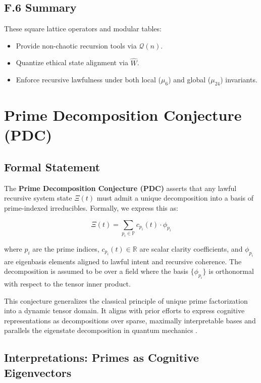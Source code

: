 \documentclass[12]{amsart}
\theoremstyle{plain}
\begin{document}
\subsection*{F.6 Summary}

These square lattice operators and modular tables:
\begin{itemize}
    \item Provide non-chaotic recursion tools via $\mathcal{Q}(n)$.
    \item Quantize ethical state alignment via $\hat{W}$.
    \item Enforce recursive lawfulness under both local ($\mu_6$) and global ($\mu_{24}$) invariants.
\end{itemize}

\section{Prime Decomposition Conjecture (PDC)}

\subsection{Formal Statement}

The \textbf{Prime Decomposition Conjecture (PDC)} asserts that any lawful recursive system state $\Xi(t)$ must admit a unique decomposition into a basis of prime-indexed irreducibles. Formally, we express this as:

\[
\Xi(t) = \sum_{p_i \in \mathbb{P}} c_{p_i}(t) \cdot \phi_{p_i}
\]

where $p_i$ are the prime indices, $c_{p_i}(t) \in \mathbb{R}$ are scalar clarity coefficients, and $\phi_{p_i}$ are eigenbasis elements aligned to lawful intent and recursive coherence. The decomposition is assumed to be over a field where the basis $\{ \phi_{p_i} \}$ is orthonormal with respect to the tensor inner product.

This conjecture generalizes the classical principle of unique prime factorization into a dynamic tensor domain. It aligns with prior efforts to express cognitive representations as decompositions over sparse, maximally interpretable bases \cite{olshausen1996emergence} and parallels the eigenstate decomposition in quantum mechanics \cite{ballentine1998quantum}.

\subsection{Interpretations: Primes as Cognitive Eigenvectors}
\end{document}
